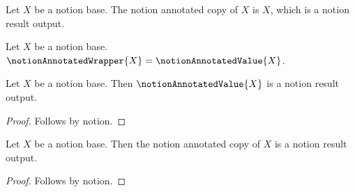 \begin{definition}\label{notion_annotated_copy}
    Let $X$ be a notion base.
    The notion annotated copy of $X$ is $X$, which is a notion result output.
\end{definition}

\begin{definition}\label{notion_annotated_wrapper}
    Let $X$ be a notion base.
    $\notionAnnotatedWrapper{X}=\notionAnnotatedValue{X}$.
\end{definition}

\begin{proposition}\label{notion_annotated_value_result}
    Let $X$ be a notion base.
    Then $\notionAnnotatedValue{X}$ is a notion result output.
\end{proposition}
\begin{proof}
    Follows by notion.
\end{proof}

\begin{proposition}\label{notion_annotated_copy_result}
    Let $X$ be a notion base.
    Then the notion annotated copy of $X$ is a notion result output.
\end{proposition}
\begin{proof}
    Follows by notion.
\end{proof}
